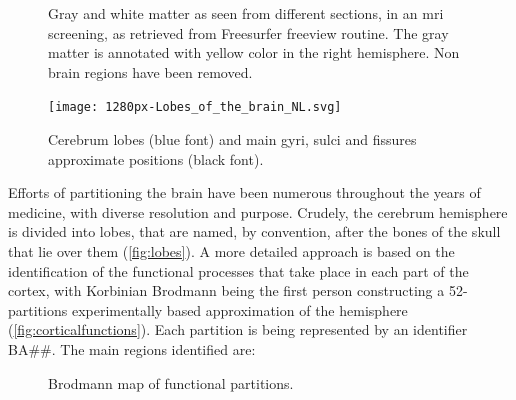 \begin{figure}[H]
	\begin{minipage}{.5\linewidth}
	\centering
	\end{minipage}%
	\begin{minipage}{.5\linewidth}
	\centering
	\end{minipage}\par\medskip
	\centering
	\caption[\Ac{mri} screening of gray and white matter]{Gray and white matter as seen from different sections, in an \ac{mri} screening, as retrieved from Freesurfer freeview routine. The gray matter is annotated with yellow color in the right hemisphere. Non brain regions have been removed.}
	\label{fig:cerebissection}
\end{figure}



\begin{figure}[H]
	\centering
	\texttt{[image: 1280px-Lobes\_of\_the\_brain\_NL.svg]}
	\caption[A crude cerebrum partitioning]{Cerebrum lobes (blue font) and main gyri, sulci and fissures approximate positions (black font).}
	\label{fig:lobes}
\end{figure}

Efforts of partitioning the brain have been numerous throughout the years of medicine, with diverse resolution and purpose. Crudely, the cerebrum hemisphere is divided into lobes, that are named, by convention, after the bones of the skull that lie over them (\autoref{fig:lobes}).  A more detailed approach is based on the identification of the functional processes that take place in each part of the cortex, with Korbinian Brodmann being the first person constructing a 52-partitions experimentally based approximation of the hemisphere \cite{Brodmann1909} (\autoref{fig:corticalfunctions}). Each partition is being represented by an identifier BA\#\#. The main regions identified are:

\begin{figure}[H]
	\centering
	\caption{Brodmann map of functional partitions.}
	\label{fig:corticalfunctions}
\end{figure}


